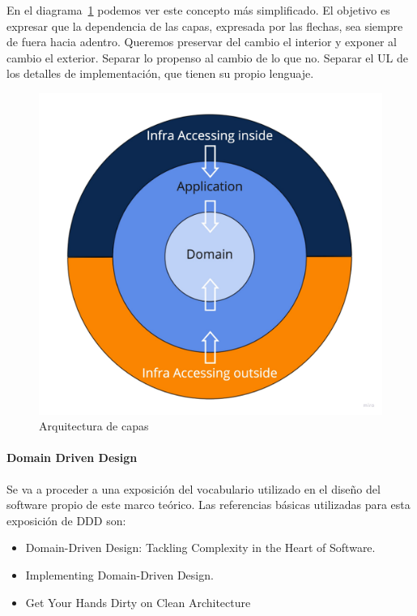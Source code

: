 En el diagrama~\cref{fig:layers} podemos ver este concepto más simplificado.
El objetivo es expresar que la dependencia de las capas, expresada por las flechas, sea siempre de fuera hacia adentro.
Queremos preservar del cambio el interior y exponer al cambio el exterior.
Separar lo propenso al cambio de lo que no.
Separar el UL de los detalles de implementación, que tienen su propio lenguaje.

\begin{figure}[H]
    \centering
    \includegraphics[height=0.3\textheight]{./part/Proyecto_ejecutivo/memoria_descriptiva/infoPreviaAntecedentes/img/PFM - Layer}
    \caption{Arquitectura de capas}\label{fig:layers}
\end{figure}

\paragraph{Domain Driven Design}

Se va a proceder a una exposición del vocabulario utilizado en el diseño del software propio de este marco teórico. Las referencias básicas utilizadas para esta exposición de \gls{DDD} son:

\begin{itemize}
    \item Domain-Driven Design: Tackling Complexity in the Heart of Software.\cite{EricEvans2003DDTC}
    \item Implementing Domain-Driven Design.\cite{VaughnVernon2013IDD}
    \item Get Your Hands Dirty on Clean Architecture\cite{TomHombergs2019GYHD}
\end{itemize}

